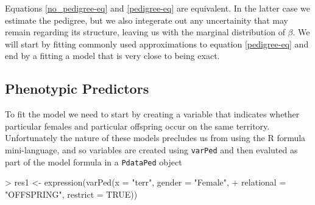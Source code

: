 \documentclass{article}
\begin{document}
Equations \ref{no_pedigree-eq} and \ref{pedigree-eq} are equivalent. In the latter case we estimate the pedigree, but we also integerate out any uncertainity that may remain regarding its structure, leaving us with the marginal distribution of $\beta$.  We will start by fitting commonly used approximations to equation \ref{pedigree-eq} and end by a fitting a model that is very close to being exact.

\subsection{Phenotypic Predictors}
\label{pred-sec}

 To fit the model we need to start by creating a variable that indicates whether particular females and particular offspring occur on the same territory.  Unfortunately the nature of these models precludes us from using the R formula mini-language,  and so variables are created using \texttt{varPed} and then evaluted as part of the model formula in a \texttt{PdataPed} object

\begin{Schunk}
\begin{Sinput}
> res1 <- expression(varPed(x = "terr", gender = "Female", 
+     relational = "OFFSPRING", restrict = TRUE))
\end{Sinput}
\end{Schunk}
\end{document}

